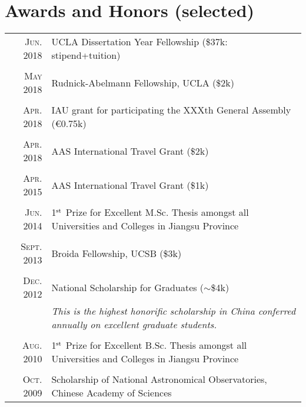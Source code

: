 \documentclass[letterpaper,10pt]{article}
\newcommand{\narrow}{-1.8ex}
\begin{document}
\section{Awards and Honors (selected)}
\begin{tabular}{r|p{5.6in}}
    \textsc{Jun. 2018} & UCLA Dissertation Year Fellowship (\$37k: stipend+tuition)    \\
    \multicolumn{2}{c}{} \\[\narrow]
    \textsc{May 2018} & Rudnick-Abelmann Fellowship, UCLA (\$2k)      \\
    \multicolumn{2}{c}{} \\[\narrow]
    \textsc{Apr. 2018} & IAU grant for participating the XXXth General Assembly (\euro0.75k)  \\
    \multicolumn{2}{c}{} \\[\narrow]
    \textsc{Apr. 2018} & AAS International Travel Grant (\$2k)    \\
    \multicolumn{2}{c}{} \\[\narrow]
    \textsc{Apr. 2015} & AAS International Travel Grant (\$1k)    \\
    \multicolumn{2}{c}{} \\[\narrow]
    \textsc{Jun. 2014} & 1$^{\rm st}$ Prize for Excellent M.Sc. Thesis amongst all Universities and Colleges in Jiangsu Province   \\
    \multicolumn{2}{c}{} \\[\narrow]
    \textsc{Sept. 2013} & Broida Fellowship, UCSB (\$3k)  \\
    \multicolumn{2}{c}{} \\[\narrow]
    \textsc{Dec. 2012} & National Scholarship for Graduates ($\sim$\$4k)  \\
                     & {\it\small This is the highest honorific scholarship in China conferred annually on excellent graduate students.}\\
    \multicolumn{2}{c}{} \\[\narrow]
    \textsc{Aug. 2010} & 1$^{\rm st}$ Prize for Excellent B.Sc. Thesis amongst all Universities and Colleges in Jiangsu Province   \\
    \multicolumn{2}{c}{} \\[\narrow]
    \textsc{Oct. 2009} & Scholarship of National Astronomical Observatories, Chinese Academy of Sciences   \\
\end{tabular}
\end{document}
